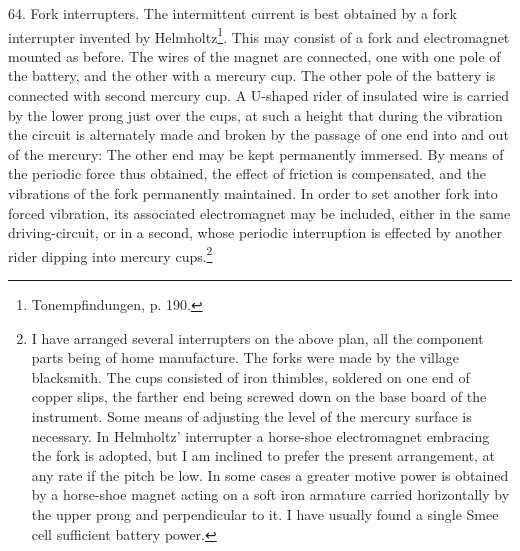 64.  Fork interrupters.
The intermittent current is best obtained by a fork interrupter invented by
Helmholtz\footnote{Tonempfindungen, p. 190.}.  This may consist of a fork and
electromagnet mounted as before. The wires of the magnet are connected, one
with one pole of the battery, and the other with a mercury cup. The other pole
of the battery is connected with second mercury cup. A U-shaped rider of
insulated wire is carried by the lower prong just over the cups, at such a
height that during the vibration the circuit is alternately made and broken by
the passage of one end into and out of the mercury: The other end may be kept
permanently immersed. By means of the periodic force thus obtained, the effect
of friction is compensated, and the vibrations of the fork permanently
maintained. In order to set another fork into forced vibration, its associated
electromagnet may be included, either in the same driving-circuit, or in a
second, whose periodic interruption is effected by another rider dipping into
mercury cups.\footnote{I have arranged several interrupters on the above
plan, all the component parts being of home manufacture. The forks were made by
the village blacksmith. The cups consisted of iron thimbles, soldered on one
end of copper slips, the farther end being screwed down on the base board of
the instrument.  Some means of adjusting the level of the mercury surface is
necessary.  In Helmholtz' interrupter a horse-shoe electromagnet embracing the
fork is adopted, but I am inclined to prefer the present arrangement, at any
rate if the pitch be low. In some cases a greater motive power is obtained by a
horse-shoe magnet acting on a soft iron armature carried horizontally by the
upper prong and perpendicular to it. I have usually found a single Smee cell
sufficient battery power.}

